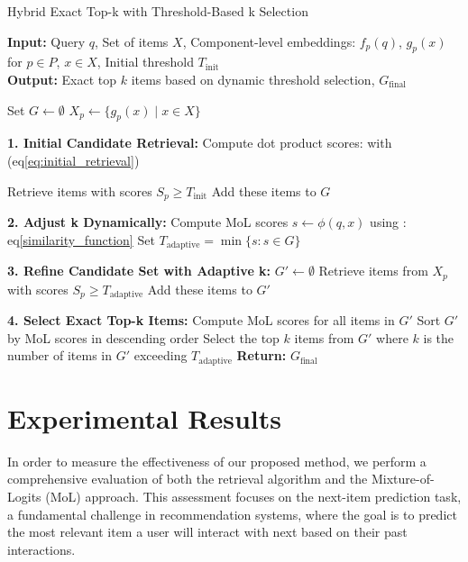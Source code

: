\begin{algorithm}
	\caption{Hybrid Exact Top-k with Threshold-Based k Selection}
	\label{ALgo1}
	\textbf{Input:} Query $q$, Set of items $X$, Component-level embeddings: $f_p(q)$, $g_p(x)$ for $p \in P$, $x \in X$, Initial threshold $T_{\text{init}}$ \\
	\textbf{Output:} Exact top $k$ items based on dynamic threshold   selection, $G_{\text{final}}$
	
	\begin{algorithmic}[1]
		
		
		\State Set $G \gets \emptyset$     
		\State $X_p \gets \{g_p(x) \mid x \in X\}$ 
		\EndFor
		
		\textbf{1. Initial Candidate Retrieval:}
		\State Compute dot product scores:  with (eq\eqref{eq:initial_retrieval})
		
		\State Retrieve items with scores $S_p \geq T_{\text{init}}$
		\State Add these items to $G$
		\EndFor
		
		\textbf{2. Adjust k Dynamically:}
		\State Compute MoL scores $s \gets \phi(q, x)$ using : eq\eqref{similarity_function}
		\State Set $T_{\text{adaptive}} = \min \{s : s \in G\}$
		\EndFor
		
		\textbf{3. Refine Candidate Set with Adaptive k:}
		\State	$G' \gets \emptyset$
		\State Retrieve items from $X_p$ with scores $S_p \geq T_{\text{adaptive}}$
		\State Add these items to $G'$
		\EndFor
		
		\textbf{4. Select Exact Top-k Items:}
		\State Compute MoL scores for all items in $G'$
		\State Sort $G'$ by MoL scores in descending order
		\State Select the top $k$ items from $G'$ where $k$ is the number of items in $G'$ exceeding $T_{\text{adaptive}}$
		\EndFor
		\State\textbf{ Return:} $G_{\text{final}}$ 
	\end{algorithmic}
\end{algorithm}

\newpage

\section{Experimental Results}\label{sec3}
In order to measure the effectiveness of our proposed method, we perform a comprehensive evaluation of both the retrieval algorithm and the Mixture-of-Logits (MoL) approach. This assessment focuses on the next-item prediction task, a fundamental challenge in recommendation systems\citep{kang2018selfat},
where the goal is to predict the most relevant item a user will interact with next based on their past interactions. 

